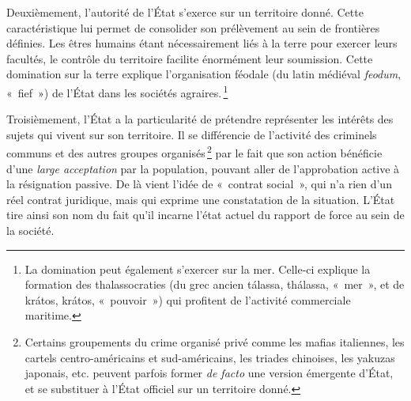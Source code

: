 \documentclass[a4paper,notitlepage]{article}
\renewenvironment{quote}{\small\list{}{\topsep=0.5\baselineskip}\item\relax}{\endlist} %
\newcommand{\sfootnote}{\,\footnote}
\begin{document}
%

Deuxièmement, l'autorité de l'État s'exerce sur un territoire donné. Cette caractéristique lui permet de consolider son prélèvement au sein de frontières définies. Les êtres humains étant nécessairement liés à la terre pour exercer leurs facultés, le contrôle du territoire facilite énormément leur soumission. Cette domination sur la terre explique l'organisation féodale (du latin médiéval \emph{feodum}, «~fief~») de l'État dans les sociétés agraires.\sfootnote{La domination peut également s'exercer sur la mer. Celle-ci explique la formation des thalassocraties (du grec ancien \foreignlanguage{greek}{tálassa}, thálassa, «~mer~», et de \foreignlanguage{greek}{krátos}, krátos, «~pouvoir~») qui profitent de l'activité commerciale maritime.}

Troisièmement, l'État a la particularité de prétendre représenter les intérêts des sujets qui vivent sur son territoire. Il se différencie de l'activité des criminels communs et des autres groupes organisés\sfootnote{Certains groupements du crime organisé privé comme les mafias italiennes, les cartels centro-américains et sud-américains, les triades chinoises, les yakuzas japonais, etc. peuvent parfois former \emph{de facto} une version émergente d'État, et se substituer à l'État officiel sur un territoire donné.} par le fait que son action bénéficie d'une \emph{large acceptation} par la population, pouvant aller de l'approbation active à la résignation passive. De là vient l'idée de «~contrat social~», qui n'a rien d'un réel contrat juridique, mais qui exprime une constatation de la situation. L'État tire ainsi son nom du fait qu'il incarne l'état actuel du rapport de force au sein de la société.
\end{document}
